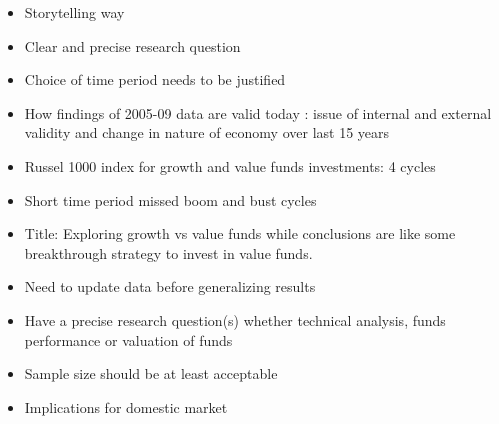 \documentclass[]{tufte-handout}
\begin{document}
\begin{itemize}
\item
  Storytelling way
\item
  Clear and precise research question
\item
  Choice of time period needs to be justified
\item
  How findings of 2005-09 data are valid today : issue of internal and
  external validity and change in nature of economy over last 15 years
\item
  Russel 1000 index for growth and value funds investments: 4 cycles
\item
  Short time period missed boom and bust cycles
\item
  Title: Exploring growth vs value funds while conclusions are like some
  breakthrough strategy to invest in value funds.
\item
  Need to update data before generalizing results
\item
  Have a precise research question(s) whether technical analysis, funds
  performance or valuation of funds
\item
  Sample size should be at least acceptable
\item
  Implications for domestic market
\end{itemize}
\end{document}
